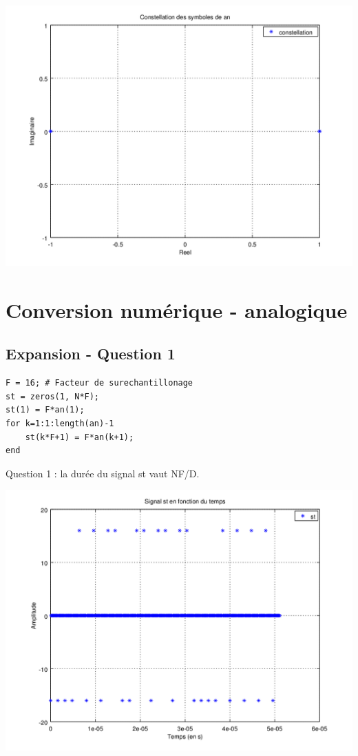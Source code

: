 \documentclass{acm_proc_article-sp}
\begin{document}
\begin{center}
\includegraphics[scale=0.45]{constell_2.png}
\end{center}


\section{Conversion numérique - analogique}
\subsection{Expansion - Question 1}

\begin{lstlisting}
F = 16; # Facteur de surechantillonage
st = zeros(1, N*F);
st(1) = F*an(1);
for k=1:1:length(an)-1
    st(k*F+1) = F*an(k+1);
end
\end{lstlisting}

Question 1 : la durée du signal st vaut NF/D.

\begin{center}
\includegraphics[scale=0.45]{st_3.png}
\end{center}
\end{document}
